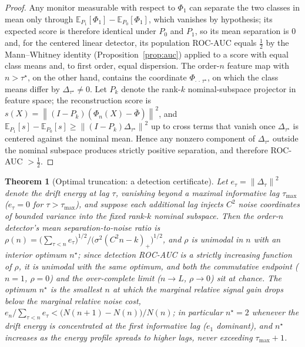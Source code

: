 \documentclass[
  aps,
  prresearch,
  reprint,
  amsmath,
  amssymb,
  nofootinbib,
  floatfix,
]{revtex4-2}
\newcommand{\norm}[1]{\left\lVert #1 \right\rVert}
\newtheorem{theorem}{Theorem}
\begin{document}
\begin{proof}
Any monitor measurable with respect to $\Phi_1$ can separate the two classes in
mean only through $\mathbb{E}_{P_1}[\Phi_1]-\mathbb{E}_{P_0}[\Phi_1]$, which vanishes
by hypothesis; its expected score is therefore identical under $P_0$ and $P_1$, so
its mean separation is $0$ and, for the centered linear detector, its population
ROC-AUC equals $\tfrac12$ by the Mann--Whitney identity
(Proposition~\ref{prop:auc}) applied to a score with equal class means and, to first
order, equal dispersion. The order-$n$ feature map with $n>\tau^\star$, on the other
hand, contains the coordinate $\Phi_{\cdot\,\cdot\,\tau^\star}$, on which the class
means differ by $\Delta_{\tau^\star}\neq0$. Let $P_k$ denote the rank-$k$
nominal-subspace projector in feature space; the reconstruction score is
$s(X)=\norm{(I-P_k)(\Phi_n(X)-\bar\Phi)}^2$, and
$\mathbb{E}_{P_1}[s]-\mathbb{E}_{P_0}[s]\ge\norm{(I-P_k)\Delta_{\tau^\star}}^2$ up to
cross terms that vanish once $\Delta_{\tau^\star}$ is centered against the nominal
mean. Hence any nonzero component of $\Delta_{\tau^\star}$ outside the nominal
subspace produces strictly positive separation, and therefore ROC-AUC $>\tfrac12$.
\end{proof}

\begin{theorem}[Optimal truncation: a detection certificate]
\label{thm:optn}
Let $e_\tau=\norm{\Delta_\tau}^2$ denote the drift energy at lag $\tau$, vanishing
beyond a maximal informative lag $\tau_{\max}$ ($e_\tau=0$ for $\tau>\tau_{\max}$),
and suppose each additional lag injects $C^2$ noise coordinates of bounded variance
into the fixed rank-$k$ nominal subspace. Then the order-$n$ detector's mean
separation-to-noise ratio is
$\rho(n)=\big(\sum_{\tau<n}e_\tau\big)^{1/2}\big/\big(\sigma^2(C^2 n-k)_+\big)^{1/2}$,
and $\rho$ is unimodal in $n$ with an interior optimum $n^\star$; since detection
ROC-AUC is a strictly increasing function of $\rho$, it is unimodal with the same
optimum, and both the commutative endpoint ($n{=}1$, $\rho=0$) and the over-complete
limit ($n\to L$, $\rho\to0$) sit at chance. The optimum $n^\star$ is the smallest
$n$ at which the marginal relative signal gain drops below the marginal relative
noise cost, $e_{n}/\!\sum_{\tau<n}e_\tau<\big(N(n{+}1)-N(n)\big)/N(n)$; in particular
$n^\star=2$ whenever the drift energy is concentrated at the first informative lag
($e_1$ dominant), and $n^\star$ increases as the energy profile spreads to higher
lags, never exceeding $\tau_{\max}+1$.
\end{theorem}
\end{document}
